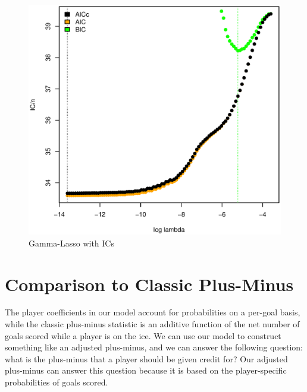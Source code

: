 \documentclass[11pt, fleqn]{article}
\begin{document}
\begin{figure}[!htb]
  \centering
  \includegraphics[scale=.5]{ic_pl_nhl_b.eps}
  \caption{Gamma-Lasso with ICs}
  \label{fig:pl_ic_nhl_b}
\end{figure}

\section{Comparison to Classic Plus-Minus}

The player coefficients in our model account for probabilities on a per-goal basis, while the classic plus-minus statistic is an additive function of the net number of goals scored while a player is on the ice. We can use our model to construct something like an adjusted plus-minus, and we can answer the following question: what is the plus-minus that a player should be given credit for? Our adjusted plus-minus can answer this question because it is based on the player-specific probabilities of goals scored.
\end{document}
